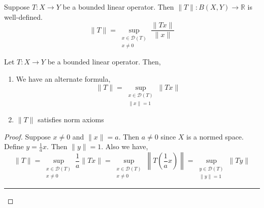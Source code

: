 	Suppose $T : X \to Y$ be a bounded linear operator.
	Then $\|T\| : B(X,Y) \to \mathbb{R}$ is well-defined.
		\[ \|T\| = \sup_{\substack{x \in \mathscr{D}(T) \\ x \ne 0}} \frac{\|Tx\|}{\|x\|} \]
\begin{lemma}
	Let $T : X \to Y$ be a bounded linear operator.
	Then,
	\begin{enumerate}
		\item We have an alternate formula, \[ \|T\| = \sup_{\substack{x \in \mathscr{D}(T) \\ \|x\| = 1}} \|Tx\| \]
		\item $\|T\|$ satisfies norm axioms
	\end{enumerate}
\end{lemma}
\begin{proof}
	Suppose $x \ne 0$ and $\|x\| = a$.
	Then $a \ne 0$ since $X$ is a normed space.
	Define $y = \frac{1}{a}x$.
	Then $\|y\| = 1$.
	Also we have,
	\[ \|T\| = \sup_{\substack{x \in \mathscr{D}(T)\\ x \ne 0}} \frac{1}{a} \|Tx\| = \sup_{\substack{x \in \mathscr{D}(T)\\ x \ne 0}} \left\| T\left(\frac{1}{a}x\right)\right\| = \sup_{\substack{y \in \mathscr{D}(T) \\ \|y\| = 1}} \| Ty\| \]

	\hrule \vspace{1em}


\end{proof}

